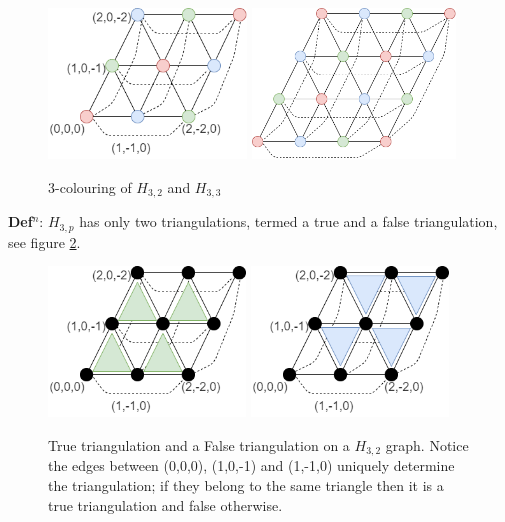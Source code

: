 \documentclass[a4paper,11pt]{report}
\newcounter{col}
\begin{document}
\begin{figure}[h!]
\begin{center}
		\includegraphics[height=40mm]{figures/colour_holyer_coord.png}
		\includegraphics[height=40mm]{figures/colour_holyer.png}
\end{center}
		\caption{3-colouring of $H_{3,2} $ and $H_{3,3}$ }
		\label{holyercolour}
\end{figure}

\textbf{Def$^n$}: $H_{3,p}$ has only two triangulations, termed a true and a false triangulation, see figure \ref{truefalsetri}. 

\begin{figure}[h!]
\begin{center}
		\includegraphics[height=40mm]{figures/holyer_true_triangulation.png}
		\includegraphics[height=40mm]{figures/holyer_false_triangulation.png}
\end{center}
		\caption{True triangulation and a False triangulation on a $H_{3,2}$ graph. Notice the edges between (0,0,0), (1,0,-1) and (1,-1,0) uniquely determine the triangulation; if they belong to the same triangle then it is a true triangulation and false otherwise.}
		\label{truefalsetri}
\end{figure}
\end{document}
